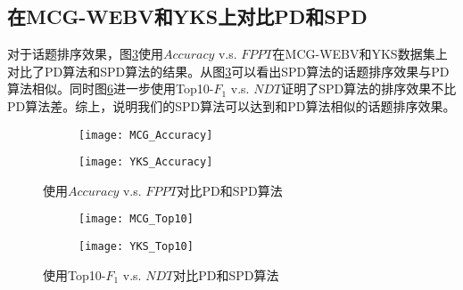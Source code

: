 \subsection{在MCG-WEBV和YKS上对比PD和SPD}

对于话题排序效果，图\ref{fig:cmp-accuracy}使用$Accuracy$ v.s. $FPPT$在MCG-WEBV和YKS数据集上对比了PD算法和SPD算法的结果。从图\ref{fig:cmp-accuracy}可以看出SPD算法的话题排序效果与PD算法相似。同时图\ref{fig:cmp-top10}进一步使用Top10-$F_1$ v.s. $NDT$证明了SPD算法的排序效果不比PD算法差。综上，说明我们的SPD算法可以达到和PD算法相似的话题排序效果。
\begin{figure}[!htbp]
    \centering
    \begin{subfigure}[b]{0.5\textwidth}
      \texttt{[image: MCG\_Accuracy]}
      \caption{}
      \label{fig:accuracycmponmcg}
    \end{subfigure}%
    \begin{subfigure}[b]{0.5\textwidth}
      \texttt{[image: YKS\_Accuracy]}
      \caption{}
      \label{fig:accuracycmponyks}
    \end{subfigure}%
    \caption{使用$Accuracy$ v.s. $FPPT$对比PD和SPD算法}
    \label{fig:cmp-accuracy}
\end{figure}
\begin{figure}[!htbp]
    \centering
    \begin{subfigure}[b]{0.49\textwidth}
      \texttt{[image: MCG\_Top10]}
      \caption{}
      \label{fig:top10cmponmcg}
    \end{subfigure}
    \begin{subfigure}[b]{0.49\textwidth}
      \texttt{[image: YKS\_Top10]}
      \caption{}
      \label{fig:top10cmponyks}
    \end{subfigure}
    \caption{使用Top10-$F_1$ v.s. $NDT$对比PD和SPD算法}
    \label{fig:cmp-top10}
\end{figure}

